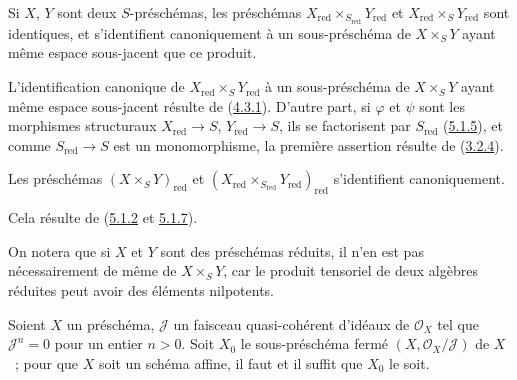 \begin{proposition}[5.1.7]
\label{I.5.1.7-fr}
Si $X$, $Y$ sont deux $S$-préschémas, les préschémas
$X_{\mathrm{red}}\times_{S_{\mathrm{red}}}Y_{\mathrm{red}}$ et
$X_{\mathrm{red}}\times_S Y_{\mathrm{red}}$ sont identiques, et
s'identifient canoniquement à un sous-préschéma de $X\times_S Y$ ayant même
espace sous-jacent que ce produit.
\end{proposition}

L'identification canonique de $X_{\mathrm{red}}\times_S Y_{\mathrm{red}}$ à
un sous-préschéma de $X\times_S Y$ ayant même espace sous-jacent résulte de
(\hyperref[I.4.3.1-fr]{4.3.1}). D'autre part, si $\varphi$ et $\psi$ sont les
morphismes structuraux $X_{\mathrm{red}}\to S$, $Y_{\mathrm{red}}\to S$, ils
se factorisent par $S_{\mathrm{red}}$
(\hyperref[I.5.1.5-fr]{5.1.5}), et comme $S_{\mathrm{red}}\to S$ est un
monomorphisme, la première assertion résulte de
(\hyperref[I.3.2.4-fr]{3.2.4}).

\begin{corollary}[5.1.8]
\label{I.5.1.8-fr}
Les préschémas $(X\times_S Y)_{\mathrm{red}}$ et
$(X_{\mathrm{red}}\times_{S_{\mathrm{red}}}Y_{\mathrm{red}})_{\mathrm{red}}$
s'identifient canoniquement.
\end{corollary}

Cela résulte de (\hyperref[I.5.1.2-fr]{5.1.2} et
\hyperref[I.5.1.7-fr]{5.1.7}).

On notera que si $X$ et $Y$ sont des préschémas réduits, il n'en est pas
nécessairement de même de $X\times_S Y$, car le produit tensoriel de deux
algèbres réduites peut avoir des éléments nilpotents.

\begin{proposition}[5.1.9]
\label{I.5.1.9-fr}
Soient $X$ un préschéma, $\mathscr{J}$ un faisceau quasi-cohérent d'idéaux de
$\mathscr{O}_X$ tel que $\mathscr{J}^n=0$ pour un entier $n>0$. Soit $X_0$ le
sous-préschéma fermé $(X,\mathscr{O}_X/\mathscr{J})$ de $X$~; pour que $X$
soit un schéma affine, il faut et il suffit que $X_0$ le soit.
\end{proposition}

